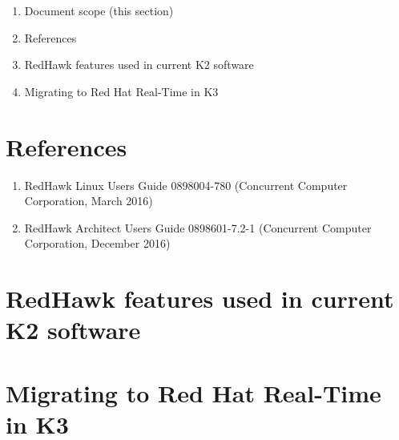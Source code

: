 \documentclass[12pt]{article}
\begin{document}
\begin{enumerate}
    \item Document scope (this section)
    \item References
    \item RedHawk features used in current K2 software
    \item Migrating to Red Hat Real-Time in K3
\end{enumerate}



\section{References}

\begin{enumerate}
    \item RedHawk Linux Users Guide 0898004-780 (Concurrent Computer Corporation, March 2016) \label{ref:red_hawk_guide}
    \item RedHawk Architect Users Guide  0898601-7.2-1 (Concurrent Computer Corporation, December 2016) \label{ref:architect}
\end{enumerate}

\section{RedHawk features used in current K2 software}
\label{sec:redhawk_features}

\section{Migrating to Red Hat Real-Time in K3}
\label{sec:redhat_migration}
\end{document}
